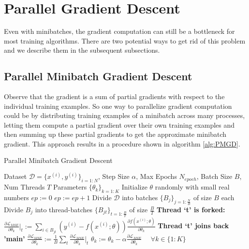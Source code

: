 \section{Parallel Gradient Descent}
\label{ParGD}

Even with minibatches, the gradient computation can still be a bottleneck for most training algorithms.
There are two potential ways to get rid of this problem and we describe them in the subsequent subsections.

\subsection{Parallel Minibatch Gradient Descent}
\label{sub:PMGD}

Observe that the gradient is a sum of partial gradients with respect to the individual training examples.
So one way to parallelize gradient computation could be by distributing training examples of a minibatch across many processes, letting them compute a partial gradient over their own training examples and then summing up these partial gradients to get the approximate minibatch gradient.
This approach results in a procedure shown in algorithm \ref{alg:PMGD}.
\begin{algorithm}[tb]
   \caption{Parallel Minibatch Gradient Descent}
   \label{alg:PMGD}
\begin{algorithmic}
    Dataset $\mathcal{D} = \{x^{(i)},y^{(i)}\}_{i=1:N}$, Step Size $\alpha$, Max Epochs $N_{epoch}$, Batch Size $B$, Num Threads $T$
    Parameters $\{\theta_k\}_{k=1:K}$
   \STATE
   \STATE Initialize $\theta$ randomly with small real numbers
   \STATE $ep := 0$
   \REPEAT
   \STATE $ep := ep + 1$
   \STATE Divide $\mathcal{D}$ into batches $\{B_j\}_{j=1:\frac{N}{B}}$ of size $B$ each
   \STATE Divide $B_j$ into thread-batches $\{B_{jt}\}_{t=1:\frac{B}{T}}$ of size $\frac{B}{T}$
   \STATE \textbf{Thread `t' is forked:}
   \STATE $\frac{\partial \mathcal{L}_{MSE}}{\partial \theta_k} \big|_t := \sum_{i \in B_{jt}} ( y^{(i)} - f(x^{(i)}; \theta)) \frac{\partial f(x^{(i)}; \theta)}{\partial \theta_k}$
   \ENDFOR
   \STATE \textbf{Thread `t' joins back 'main'}
   \STATE $\frac{\partial \mathcal{L}_{MSE}}{\partial \theta_k} := \frac{1}{B} \sum_t \frac{\partial \mathcal{L}_{MSE}}{\partial \theta_k} \big|_t$
   \ENDFOR
   \STATE $\theta_k := \theta_k - \alpha \frac{\partial \mathcal{L}_{MSE}}{\partial \theta_k} \hspace{16pt} \forall k \in \{1:K\}$
   \ENDFOR
\end{algorithmic}
\end{algorithm}

